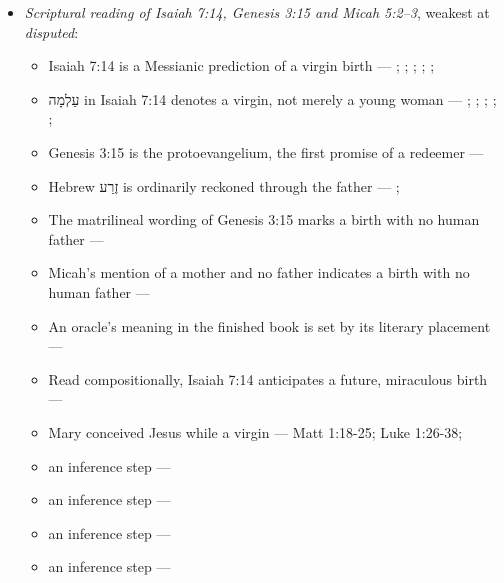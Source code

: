 \documentclass[11pt]{article}
\begin{document}
\begin{itemize}
\item \emph{Scriptural reading of Isaiah 7:14, Genesis 3:15 and Micah 5:2–3}, weakest at \emph{disputed}:
\begin{itemize}
\item Isaiah 7:14 is a Messianic prediction of a virgin birth --- \cite[ad loc. Isa 7:14]{motyer-isaiah-1993}; \cite[123]{motyer-context-content-1970}; \cite[12--14]{compton-immanuel-prophecy-2007}; \cite[66]{justin-dialogue-with-trypho-160}; \cite[III.21.6]{irenaeus-against-heresies-180}; \cite[I.35]{origen-against-celsus-248}
\item עַלְמָה in Isaiah 7:14 denotes a virgin, not merely a young woman --- \cite[ad loc. Isa 7:14]{motyer-isaiah-1993}; \cite[app. Isa 7:14]{bhs-1997}; \cite[1653--1654]{berry-virgin-birth-2003}; \cite[125]{motyer-context-content-1970}; \cite[7--8]{compton-immanuel-prophecy-2007}; \cite[I.32]{jerome-against-jovinianus-393}
\item Genesis 3:15 is the protoevangelium, the first promise of a redeemer --- \cite[9--10]{miravalle-meet-mary-2007}
\item Hebrew זֶרַע is ordinarily reckoned through the father --- \cite[9--10]{miravalle-meet-mary-2007}; \cite[app. Gen 3:15]{bhs-1997}
\item The matrilineal wording of Genesis 3:15 marks a birth with no human father --- \cite[9--10]{miravalle-meet-mary-2007}
\item Micah's mention of a mother and no father indicates a birth with no human father --- \cite[9--10]{miravalle-meet-mary-2007}
\item An oracle's meaning in the finished book is set by its literary placement --- \cite[483--486]{postell-isaiah-messianic-2025}
\item Read compositionally, Isaiah 7:14 anticipates a future, miraculous birth --- \cite[490--493]{postell-isaiah-messianic-2025}
\item Mary conceived Jesus while a virgin --- Matt 1:18-25; Luke 1:26-38; \cite[30--33]{brown-problem-virginal-conception-1972}
\item an inference step --- \cite[ad loc. Isa 7:14]{motyer-isaiah-1993}
\item an inference step --- \cite[9--10]{miravalle-meet-mary-2007}
\item an inference step --- \cite[490--493]{postell-isaiah-messianic-2025}
\item an inference step --- \cite[ad loc. Matt 1:23]{france-matthew-2007}

\end{itemize}
\end{itemize}
\end{document}
